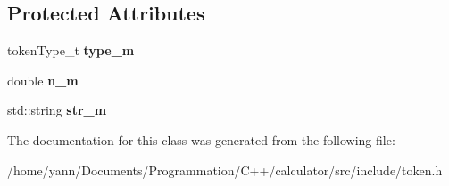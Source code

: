 \subsection*{Protected Attributes}
\begin{DoxyCompactItemize}
\item 
\hypertarget{class_token_a01979ac699ac624615570cf0ea1e5b71}{token\-Type\-\_\-t {\bfseries type\-\_\-m}}\label{class_token_a01979ac699ac624615570cf0ea1e5b71}

\item 
\hypertarget{class_token_ab5e62028b935156e5f69f3a50b20c078}{double {\bfseries n\-\_\-m}}\label{class_token_ab5e62028b935156e5f69f3a50b20c078}

\item 
\hypertarget{class_token_a2781f7d67fae2fa1cbfe4af5caf8473d}{std\-::string {\bfseries str\-\_\-m}}\label{class_token_a2781f7d67fae2fa1cbfe4af5caf8473d}

\end{DoxyCompactItemize}


The documentation for this class was generated from the following file\-:\begin{DoxyCompactItemize}
\item 
/home/yann/\-Documents/\-Programmation/\-C++/calculator/src/include/token.\-h\end{DoxyCompactItemize}
